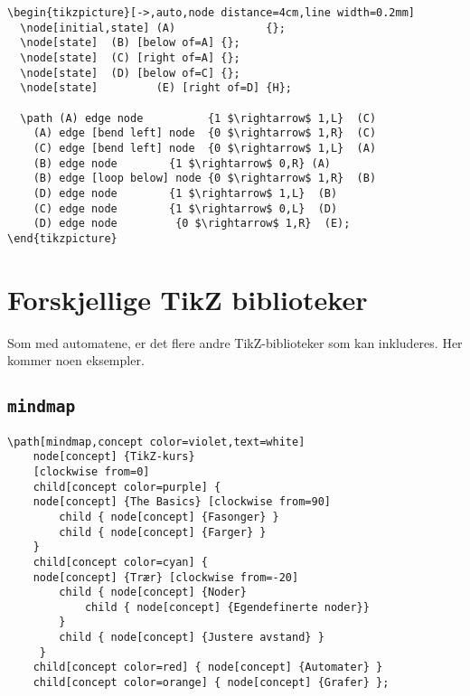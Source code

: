 \documentclass[11pt, a4paper]{article}
\begin{document}
\begin{Verbatim}[fontsize=\small, frame=single]
\begin{tikzpicture}[->,auto,node distance=4cm,line width=0.2mm]
  \node[initial,state] (A)              {};
  \node[state] 	(B) [below of=A] {};
  \node[state] 	(C) [right of=A] {};
  \node[state] 	(D) [below of=C] {};
  \node[state]         (E) [right of=D] {H};

  \path (A) edge node   	   {1 $\rightarrow$ 1,L}  (C)
	(A) edge [bend left] node  {0 $\rightarrow$ 1,R}  (C)
	(C) edge [bend left] node  {0 $\rightarrow$ 1,L}  (A)
	(B) edge node 	     {1 $\rightarrow$ 0,R} (A)
	(B) edge [loop below] node {0 $\rightarrow$ 1,R}  (B)
	(D) edge node 	     {1 $\rightarrow$ 1,L}  (B)
	(C) edge node 	     {1 $\rightarrow$ 0,L}  (D)
	(D) edge node	      {0 $\rightarrow$ 1,R}  (E);
\end{tikzpicture}
\end{Verbatim}

\newpage

\section{Forskjellige TikZ biblioteker}
Som med automatene, er det flere andre TikZ-biblioteker som kan inkluderes. Her kommer noen eksempler.

\subsection{\texttt{mindmap}}

\begin{center}
\end{center}

\begin{Verbatim}[fontsize=\footnotesize, frame=single]
\path[mindmap,concept color=violet,text=white]
    node[concept] {TikZ-kurs}
    [clockwise from=0]
    child[concept color=purple] { 
    node[concept] {The Basics} [clockwise from=90]
        child { node[concept] {Fasonger} }
        child { node[concept] {Farger} }
    }  
    child[concept color=cyan] {
    node[concept] {Trær} [clockwise from=-20]
        child { node[concept] {Noder} 
            child { node[concept] {Egendefinerte noder}}
        }
        child { node[concept] {Justere avstand} }
     }
    child[concept color=red] { node[concept] {Automater} }
    child[concept color=orange] { node[concept] {Grafer} };
\end{Verbatim}
\end{document}

